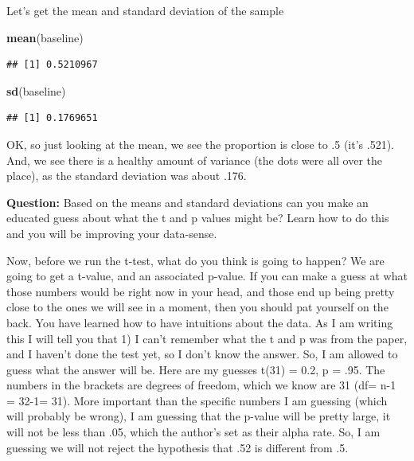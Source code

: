 \documentclass[]{book}
\newenvironment{Shaded}{\begin{snugshade}}{\end{snugshade}}
\newcommand{\KeywordTok}[1]{\textcolor[rgb]{0.13,0.29,0.53}{\textbf{#1}}}
\newcommand{\NormalTok}[1]{#1}
\begin{document}
Let's get the mean and standard deviation of the sample

\begin{Shaded}
\begin{Highlighting}[]
\KeywordTok{mean}\NormalTok{(baseline)}
\end{Highlighting}
\end{Shaded}

\begin{verbatim}
## [1] 0.5210967
\end{verbatim}

\begin{Shaded}
\begin{Highlighting}[]
\KeywordTok{sd}\NormalTok{(baseline)}
\end{Highlighting}
\end{Shaded}

\begin{verbatim}
## [1] 0.1769651
\end{verbatim}

OK, so just looking at the mean, we see the proportion is close to .5
(it's .521). And, we see there is a healthy amount of variance (the dots
were all over the place), as the standard deviation was about .176.

\textbf{Question:} Based on the means and standard deviations can you
make an educated guess about what the t and p values might be? Learn how
to do this and you will be improving your data-sense.

Now, before we run the t-test, what do you think is going to happen? We
are going to get a t-value, and an associated p-value. If you can make a
guess at what those numbers would be right now in your head, and those
end up being pretty close to the ones we will see in a moment, then you
should pat yourself on the back. You have learned how to have intuitions
about the data. As I am writing this I will tell you that 1) I can't
remember what the t and p was from the paper, and I haven't done the
test yet, so I don't know the answer. So, I am allowed to guess what the
answer will be. Here are my guesses t(31) = 0.2, p = .95. The numbers in
the brackets are degrees of freedom, which we know are 31 (df= n-1 =
32-1= 31). More important than the specific numbers I am guessing (which
will probably be wrong), I am guessing that the p-value will be pretty
large, it will not be less than .05, which the author's set as their
alpha rate. So, I am guessing we will not reject the hypothesis that .52
is different from .5.
\end{document}
